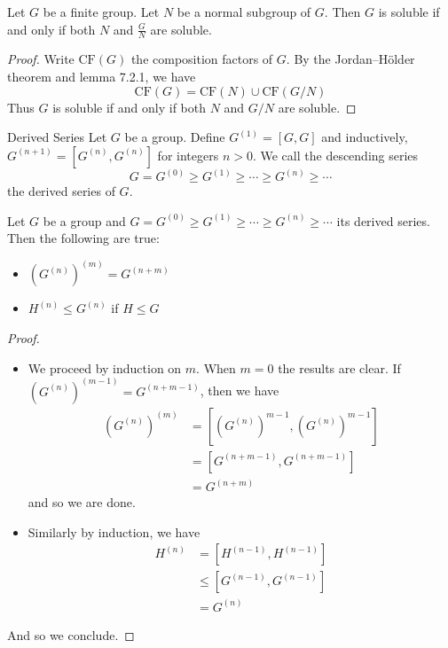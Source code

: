 \documentclass[a4paper]{article}
\begin{document}
\begin{lmm}{}{} Let $G$ be a finite group. Let $N$ be a normal subgroup of $G$. Then $G$ is soluble if and only if both $N$ and $\frac{G}{N}$ are soluble. \tcbline
\begin{proof}
Write $\text{CF}(G)$ the composition factors of $G$. By the Jordan–Hölder theorem and lemma 7.2.1, we have $$\text{CF}(G)=\text{CF}(N)\cup\text{CF}(G/N)$$ Thus $G$ is soluble if and only if both $N$ and $G/N$ are soluble. 
\end{proof}
\end{lmm}

\begin{defn}{Derived Series}{} Let $G$ be a group. Define $G^{(1)}=[G,G]$ and inductively, $G^{(n+1)}=[G^{(n)},G^{(n)}]$ for integers $n>0$. We call the descending series $$G=G^{(0)}\geq G^{(1)}\geq \cdots\geq G^{(n)}\geq \cdots$$ the derived series of $G$. 
\end{defn}

\begin{lmm}{}{} Let $G$ be a group and $G=G^{(0)}\geq G^{(1)}\geq \cdots\geq G^{(n)}\geq \cdots$ its derived series. Then the following are true: 
\begin{itemize}
\item $(G^{(n)})^{(m)}=G^{(n+m)}$
\item $H^{(n)}\leq G^{(n)}$ if $H\leq G$
\end{itemize} \tcbline
\begin{proof}~\\
\begin{itemize}
\item We proceed by induction on $m$. When $m=0$ the results are clear. If $(G^{(n)})^{(m-1)}=G^{(n+m-1)}$, then we have 
\begin{align*}
(G^{(n)})^{(m)}&=[(G^{(n)})^{m-1},(G^{(n)})^{m-1}]\\
&=[G^{(n+m-1)},G^{(n+m-1)}]\\
&=G^{(n+m)}
\end{align*} and so we are done. 
\item Similarly by induction, we have 
\begin{align*}
H^{(n)}&=[H^{(n-1)},H^{(n-1)}]\\
&\leq[G^{(n-1)},G^{(n-1)}]\\
&=G^{(n)}
\end{align*}
\end{itemize}
And so we conclude. 
\end{proof}
\end{lmm}
\end{document}
